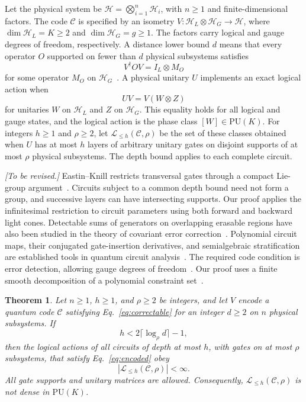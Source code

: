 \documentclass[aps,prl,reprint,notitlepage,nofootinbib,nobibnotes]{revtex4-2}
\newtheorem{theorem}{Theorem}
\newcommand{\HH}{\mathcal H}
\newcommand{\PU}{\mathrm{PU}}
\newcommand{\id}{I}
\begin{document}
Let the physical system be \(\HH=\bigotimes_{i=1}^{n}\HH_i\), with
\(n\ge1\) and finite-dimensional factors. The code \(\mathcal C\) is specified
by an isometry \(V:\HH_L\otimes\HH_G\longrightarrow\HH\), where
\(\dim\HH_L=K\ge2\) and \(\dim\HH_G=g\ge1\). The factors carry logical and
gauge degrees of freedom, respectively.
A distance lower bound \(d\) means that every operator \(O\) supported on
fewer than \(d\) physical subsystems satisfies
\begin{equation}\label{eq:correctable}
  V^\dagger O V=\id_L\otimes M_O
\end{equation}
for some operator \(M_O\) on \(\HH_G\)~\cite{KL,Kribs}.
A physical unitary \(U\) implements an exact logical action when
\begin{equation}\label{eq:encoded}
  UV=V(W\otimes Z)
\end{equation}
for unitaries \(W\) on \(\HH_L\) and \(Z\) on \(\HH_G\).
This equality holds for all logical and gauge states, and the logical
action is the phase class \([W]\in\PU(K)\).
For integers \(h\ge1\) and \(\rho\ge2\), let
\(\mathcal L_{\le h}(\mathcal C,\rho)\) be the set of these classes obtained
when \(U\) has at most \(h\) layers of arbitrary unitary gates on disjoint
supports of at most \(\rho\) physical subsystems.
The depth bound applies to each complete circuit.

\textcolor{LinkDarkRed}{\textit{[To be revised.]}}\quad
Eastin--Knill restricts transversal gates through a compact Lie-group
argument~\cite{EK}. Circuits subject to a common depth bound need not
form a group, and successive layers can have intersecting supports.
Our proof applies the infinitesimal restriction to circuit parameters
using both forward and backward light cones.
Detectable sums of generators on overlapping erasable regions have also
been studied in the theory of covariant error
correction~\cite{Faist,LiuZhou}. Polynomial circuit maps, their
conjugated gate-insertion derivatives, and semialgebraic stratification
are established tools in quantum circuit analysis~\cite{Haferkamp}.
The required code condition is error detection, allowing gauge degrees
of freedom~\cite{KL,Kribs}.
Our proof uses a finite smooth decomposition of a polynomial constraint
set~\cite{Plaumann}.

\begin{samepage}
\begin{theorem}\label{thm:depth}
Let \(n\ge1\), \(h\ge1\), and \(\rho\ge2\) be integers, and let
\(V\) encode a quantum code \(\mathcal C\) satisfying Eq.~\eqref{eq:correctable}
for an integer \(d\ge2\) on \(n\) physical subsystems. If
\begin{equation}\label{eq:depth}
  h<2\lceil\log_{\rho} d\rceil-1,
\end{equation}
then the logical actions of all circuits of depth at most \(h\), with gates
on at most \(\rho\) subsystems, that satisfy Eq.~\eqref{eq:encoded} obey
\[
 |\mathcal L_{\le h}(\mathcal C,\rho)|<\infty.
\]
All gate supports and unitary matrices are allowed. Consequently,
\(\mathcal L_{\le h}(\mathcal C,\rho)\) is not dense in \(\PU(K)\).
\end{theorem}
\end{samepage}
\end{document}
